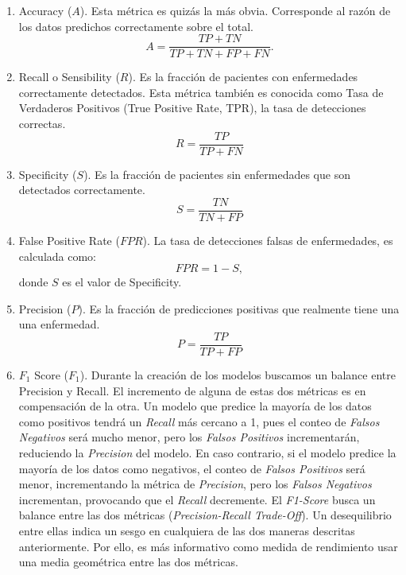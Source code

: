 \begin{enumerate}
    \item Accuracy ($A$). Esta métrica es quizás la más obvia. Corresponde al razón de los datos
          predichos correctamente sobre el total.
    \begin{equation}
        \label{eq:accuracy}
        A = \frac{TP+TN}{TP+TN+FP+FN}.
    \end{equation}

    \item Recall o Sensibility ($R$). Es la fracción de pacientes con enfermedades correctamente
          detectados. Esta métrica también es conocida como Tasa de Verdaderos Positivos (True
          Positive Rate, TPR), la tasa de detecciones correctas.
    \begin{equation}
        \label{eq:TPR}
        R = \frac{TP}{TP + FN}
    \end{equation}

    \item Specificity ($S$). Es la fracción de pacientes sin enfermedades que son detectados
          correctamente.
    \begin{equation}
        \label{eq:Specificity}
        S = \frac{TN}{TN + FP}
    \end{equation}

    \item False Positive Rate ($FPR$). La tasa de detecciones falsas de enfermedades, es calculada
          como:
    \begin{equation}
        \label{eq:FPR}
        FPR = 1 - S,
    \end{equation}
    donde $S$ es el valor de Specificity.

    \item Precision ($P$). Es la fracción de predicciones positivas que realmente tiene una una
          enfermedad.
    \begin{equation}
        \label{eq:P}
        P = \frac{TP}{TP + FP}
    \end{equation}

    \item $F_1$ Score ($F_1$).  Durante la creación de los modelos buscamos un balance entre Precision y
        Recall. El incremento de alguna de estas dos métricas es en compensación de la otra. Un modelo que predice
        la mayoría de los datos como positivos tendrá un \textit{Recall} más cercano a 1, pues el conteo de
        \textit{Falsos Negativos} será mucho menor, pero los \textit{Falsos Positivos} incrementarán, reduciendo
        la \textit{Precision} del modelo. En caso contrario, si el modelo predice la mayoría de los datos como
        negativos, el conteo de \textit{Falsos Positivos} será menor, incrementando la métrica de \textit{Precision},
        pero los \textit{Falsos Negativos} incrementan, provocando que el \textit{Recall} decremente. El
        \textit{F1-Score} busca un balance entre las dos métricas (\textit{Precision-Recall Trade-Off}). Un
        desequilibrio entre ellas indica un sesgo en cualquiera de las dos maneras descritas anteriormente. Por
        ello, es más informativo como medida de rendimiento usar una media geométrica entre las dos métricas.


\end{enumerate}
